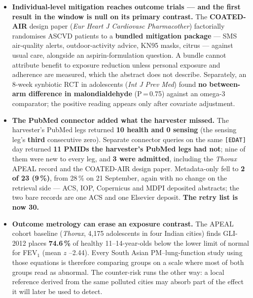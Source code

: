 \documentclass[10pt]{article}
\begin{document}
\begin{itemize}
\item \textbf{Individual-level mitigation reaches outcome trials --- and the first result
in the window is null on its primary contrast.} The \textbf{COATED-AIR} design paper
(\textit{Eur Heart J Cardiovasc Pharmacother}) factorially randomises ASCVD patients to a
\textbf{bundled mitigation package} --- SMS air-quality alerts, outdoor-activity advice,
KN95 masks, citrus --- against usual care, alongside an aspirin-formulation question. A
bundle cannot attribute benefit to exposure reduction unless personal exposure and
adherence are measured, which the abstract does not describe. Separately, an
8-week synbiotic RCT in adolescents (\textit{Int J Prev Med}) found \textbf{no between-arm
difference in malondialdehyde} (P\,=\,0.75) against an omega-3 comparator; the positive
reading appears only after covariate adjustment.

\item \textbf{The PubMed connector added what the harvester missed.} The harvester's
PubMed legs returned \textbf{10 health and 0 sensing} (the sensing leg's \textbf{third}
consecutive zero). Separate connector queries on the same \texttt{[EDAT]} day returned
\textbf{11 PMIDs the harvester's PubMed legs had not}; nine of them were new to every leg, and \textbf{3 were admitted}, including the
\textit{Thorax} APEAL record and the COATED-AIR design paper. Metadata-only fell to
\textbf{2 of 23 (9\,\%)}, from 28\,\% on 21 September, again with no change on the
retrieval side --- ACS, IOP, Copernicus and MDPI deposited abstracts; the two bare records
are one ACS and one Elsevier deposit. \textbf{The retry list is now 30.}

\item \textbf{Outcome metrology can erase an exposure contrast.} The APEAL cohort baseline
(\textit{Thorax}, 4,175 adolescents in four Indian cities) finds GLI-2012 places
\textbf{74.6\,\%} of healthy 11--14-year-olds below the lower limit of normal for FEV$_1$
(mean $z$ --2.44). Every South Asian PM--lung-function study using those equations is
therefore comparing groups on a scale where most of both groups read as abnormal. The
counter-risk runs the other way: a local reference derived from the same polluted cities
may absorb part of the effect it will later be used to detect.

\end{itemize}

\vspace{2mm}
\end{document}
